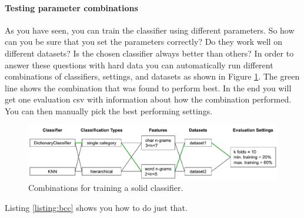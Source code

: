 \documentclass[a4paper,twoside]{book}      %
\begin{document}
\paragraph{Testing parameter combinations}
As you have seen, you can train the classifier using different parameters. So how can you be sure that you set the parameters correctly? Do they work well on different datasets? Is the chosen classifier always better than others? In order to answer these questions with hard data you can automatically run different combinations of classifiers, settings, and datasets as shown in Figure \ref{fig:bcc}. The green line shows the combination that was found to perform best. In the end you will get one evaluation csv with information about how the combination performed. You can then manually pick the best performing settings.

\begin{figure}[ht!]
\centering
\includegraphics[width=\columnwidth]{img/bcc.pdf}
\caption{Combinations for training a solid classifier.}
\label{fig:bcc}
\end{figure}

Listing \ref{listing:bcc} shows you how to do just that.
\end{document}
